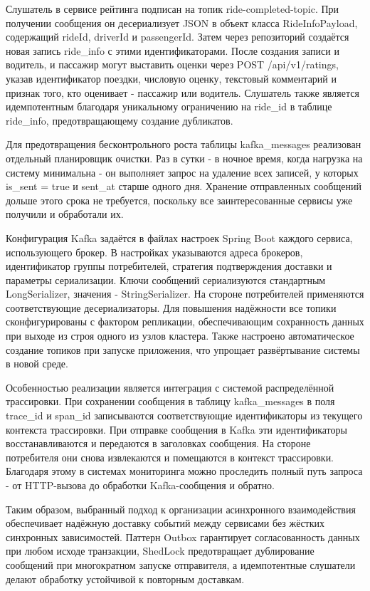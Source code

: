 {  \par \redline Слушатель в сервисе рейтинга подписан на топик ride-completed-topic. При получении сообщения он десериализует JSON в объект класса RideInfoPayload, содержащий rideId, driverId и passengerId. Затем через репозиторий создаётся новая запись ride\_info с этими идентификаторами. После создания записи и водитель, и пассажир могут выставить оценки через POST /api/v1/ratings, указав идентификатор поездки, числовую оценку, текстовый комментарий и признак того, кто оценивает - пассажир или водитель. Слушатель также является идемпотентным благодаря уникальному ограничению на ride\_id в таблице ride\_info, предотвращающему создание дубликатов.

  \par \redline Для предотвращения бесконтрольного роста таблицы kafka\_messages реализован отдельный планировщик очистки. Раз в сутки - в ночное время, когда нагрузка на систему минимальна - он выполняет запрос на удаление всех записей, у которых is\_sent = true и sent\_at старше одного дня. Хранение отправленных сообщений дольше этого срока не требуется, поскольку все заинтересованные сервисы уже получили и обработали их.

  \par \redline Конфигурация Kafka задаётся в файлах настроек Spring Boot каждого сервиса, использующего брокер. В настройках указываются адреса брокеров, идентификатор группы потребителей, стратегия подтверждения доставки и параметры сериализации. Ключи сообщений сериализуются стандартным LongSerializer, значения - StringSerializer. На стороне потребителей применяются соответствующие десериализаторы. Для повышения надёжности все топики сконфигурированы с фактором репликации, обеспечивающим сохранность данных при выходе из строя одного из узлов кластера. Также настроено автоматическое создание топиков при запуске приложения, что упрощает развёртывание системы в новой среде.

  \par \redline Особенностью реализации является интеграция с системой распределённой трассировки. При сохранении сообщения в таблицу kafka\_messages в поля trace\_id и span\_id записываются соответствующие идентификаторы из текущего контекста трассировки. При отправке сообщения в Kafka эти идентификаторы восстанавливаются и передаются в заголовках сообщения. На стороне потребителя они снова извлекаются и помещаются в контекст трассировки. Благодаря этому в системах мониторинга можно проследить полный путь запроса - от HTTP-вызова до обработки Kafka-сообщения и обратно.

  \par \redline Таким образом, выбранный подход к организации асинхронного взаимодействия обеспечивает надёжную доставку событий между сервисами без жёстких синхронных зависимостей. Паттерн Outbox гарантирует согласованность данных при любом исходе транзакции, ShedLock предотвращает дублирование сообщений при многократном запуске отправителя, а идемпотентные слушатели делают обработку устойчивой к повторным доставкам.

  \par
}

\setcounter{subchaptercntr}{1}
\setcounter{formulacntr}{1}
\setcounter{imagecntr}{1}
\setcounter{tablecntr}{1}
